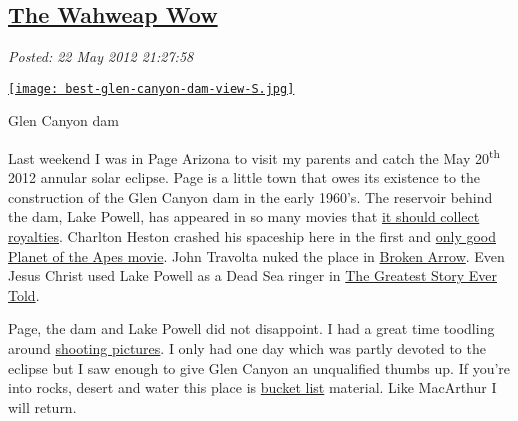%

\subsection*{\href{http://bakerjd99.wordpress.com/2012/05/22/the-wahweap-wow/}{The Wahweap Wow}}


\noindent\emph{Posted: 22 May 2012 21:27:58}
\vspace{6pt}



\captionsetup[floatingfigure]{labelformat=empty}
\begin{floatingfigure}[r]{0.32\textwidth}
\centering
\href{http://conceptcontrol.smugmug.com/Trips/USA-and-Canada/Arizona-Toodling-1/7475075\_MrjqMc}{\texttt{[image: best-glen-canyon-dam-view-S.jpg]}}
\caption{Glen Canyon dam}
\label{fig:2818X0}
\end{floatingfigure}Last weekend I was in Page Arizona to visit my parents and catch the May
20\textsuperscript{th} 2012 annular solar eclipse. Page is a little town
that owes its existence to the construction of the Glen Canyon dam in
the early 1960's. The reservoir behind the dam, Lake Powell, has
appeared in so many movies that
\href{http://www.lakepowellrealty.net/lake-powell-movies/}{it should
collect royalties}. Charlton Heston crashed his spaceship here in the first
and
\href{http://en.wikipedia.org/wiki/Planet\_of\_the\_Apes\_(1968\_film)}{only
good Planet of the Apes movie}. John Travolta
nuked the place in \href{http://www.imdb.com/title/tt0115759/}{Broken
Arrow}. Even Jesus Christ used Lake Powell as a Dead Sea ringer in
\href{http://www.imdb.com/title/tt0059245/}{The Greatest Story Ever
Told}.

Page, the dam and Lake Powell did not disappoint. I had a great time
toodling around \href{http://conceptcontrol.smugmug.com/Trips/USA-and-Canada/Arizona-Toodling-1/7475075_MrjqMc}{shooting pictures}. I only 
had one day which was partly
devoted to the eclipse but I saw enough to give Glen Canyon an
unqualified thumbs up. If you're into rocks, desert and water this place
is \href{http://bucketlist.org/}{bucket list} material. Like MacArthur I
will return.



